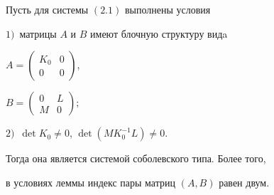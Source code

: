 \begin{lems}


Пусть для системы $(2.1)$ выполнены условия


$1)$~матрицы $A$ и $B$ имеют блочную структуру видa


$A=\left( \begin{smallmatrix}


K_0 & 0 \\ 0 & 0


\end{smallmatrix}\right)$,


$B=\left( \begin{smallmatrix}


0 & L \\ M & 0


\end{smallmatrix}\right);$


$2)$~$\det K_0\neq 0$, $\det (MK_0^{-1}L)\ne 0$.


Тогда она является системой соболевского типа. Более того,


в условиях леммы индекс пары матриц $(A,B)$ равен двум.


\end{lems}





